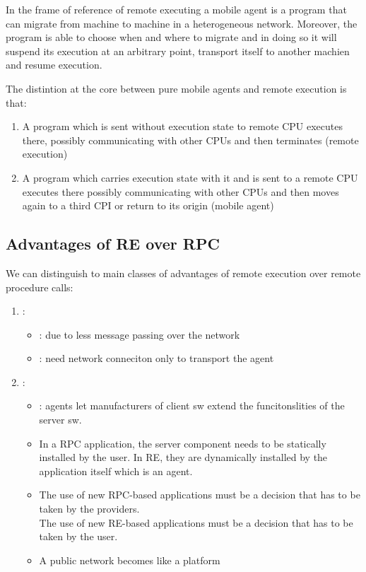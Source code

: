 In the frame of reference of remote executing a mobile agent is a program that can migrate from machine to machine in a heterogeneous network. Moreover, the program is able to choose when and where to migrate and in doing so it will suspend its execution at an arbitrary point, transport itself to another machien and resume execution.

The distintion at the core between pure mobile agents and remote execution is that:
\begin{enumerate}
\item A program which is sent without execution state to remote CPU executes there, possibly communicating with other CPUs and then terminates (remote execution)
\item A program which carries execution state with it and is sent to a remote CPU executes there possibly communicating with other CPUs and then moves again to a third CPI or return to its origin (mobile agent)
\end{enumerate}

\subsection{Advantages of RE over RPC}
We can distinguish to main classes of advantages of remote execution over remote procedure calls:
\begin{enumerate}
\item {}:
\begin{itemize}
\item {}: due to less message passing over the network
\item {}: need network conneciton only to transport the agent
\end{itemize}
\item {}:
\begin{itemize}
\item {}: agents let manufacturers of client sw extend the funcitonslities of the server sw.
\item In a RPC application, the server component needs to be statically installed by the user. In RE, they are dynamically installed by the application itself which is an agent.
\item The use of new RPC-based applications must be a decision that has to be taken by the providers.\\
The use of new RE-based applications must be a decision that has to be taken by the user.
\item A public network becomes like a platform
\end{itemize}
\end{enumerate}

